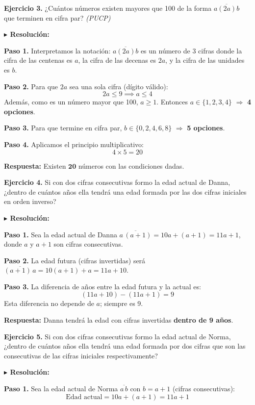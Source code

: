 \documentclass[10pt]{article}
\newcommand{\ejercicio}[2]{%
  \begin{enuncbox}
    \textbf{\textcolor{enunciado}{Ejercicio #1.}} #2
  \end{enuncbox}
}
\newcommand{\resolucion}{\vspace{2pt}\textbf{\textcolor{resolucion}{$\blacktriangleright$ Resolución:}}\vspace{4pt}}
\newcommand{\respuesta}[1]{%
  \begin{respbox}
    \textbf{\textcolor{respuesta}{Respuesta:}} #1
  \end{respbox}
}
\begin{document}
\ejercicio{3}{¿Cuántos números existen mayores que 100 de la forma $\overline{a(2a)b}$ que terminen en cifra par? \hfill \textit{(PUCP)}}

\resolucion

\textbf{Paso 1.} Interpretamos la notación: $\overline{a(2a)b}$ es un número de 3 cifras donde la cifra de las centenas es $a$, la cifra de las decenas es $2a$, y la cifra de las unidades es $b$.

\textbf{Paso 2.} Para que $2a$ sea una sola cifra (dígito válido):
\[
    2a \leq 9 \implies a \leq 4
\]
Además, como es un número mayor que 100, $a \geq 1$. Entonces $a \in \{1, 2, 3, 4\}$ $\Rightarrow$ \textbf{4 opciones}.

\textbf{Paso 3.} Para que termine en cifra par, $b \in \{0, 2, 4, 6, 8\}$ $\Rightarrow$ \textbf{5 opciones}.

\textbf{Paso 4.} Aplicamos el principio multiplicativo:
\[
    4 \times 5 = 20
\]

\respuesta{Existen $\mathbf{20}$ números con las condiciones dadas.}

\ejercicio{4}{Si con dos cifras consecutivas formo la edad actual de Danna, ¿dentro de cuántos años ella tendrá una edad formada por las dos cifras iniciales en orden inverso?}

\resolucion

\textbf{Paso 1.} Sea la edad actual de Danna $\overline{a\,(a+1)} = 10a + (a+1) = 11a + 1$, donde $a$ y $a+1$ son cifras consecutivas.

\textbf{Paso 2.} La edad futura (cifras invertidas) será $\overline{(a+1)\,a} = 10(a+1) + a = 11a + 10$.

\textbf{Paso 3.} La diferencia de años entre la edad futura y la actual es:
\[
    (11a + 10) - (11a + 1) = 9
\]
Esta diferencia no depende de $a$; siempre es 9.

\respuesta{Danna tendrá la edad con cifras invertidas \textbf{dentro de 9 años}.}

\ejercicio{5}{Si con dos cifras consecutivas formo la edad actual de Norma, ¿dentro de cuántos años ella tendrá una edad formada por dos cifras que son las consecutivas de las cifras iniciales respectivamente?}

\resolucion

\textbf{Paso 1.} Sea la edad actual de Norma $\overline{a\,b}$ con $b = a+1$ (cifras consecutivas):
\[
    \text{Edad actual} = 10a + (a+1) = 11a + 1
\]
\end{document}
